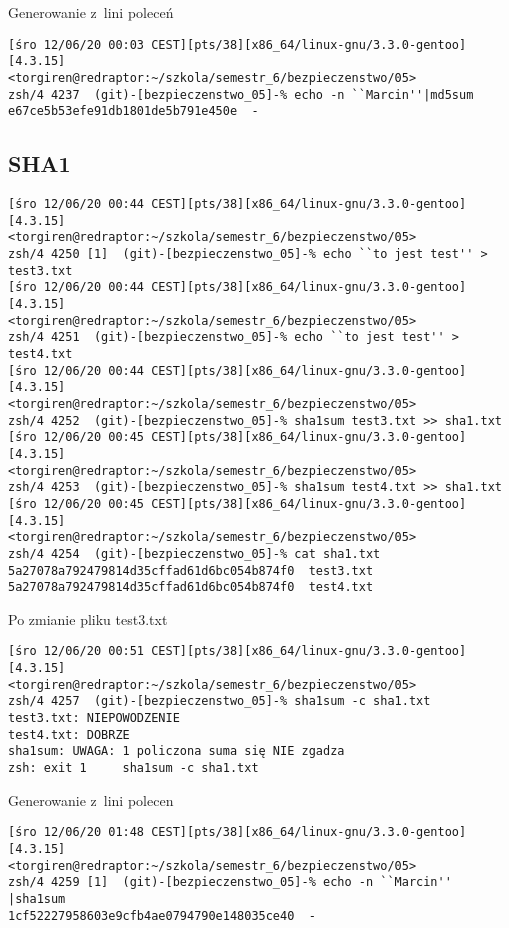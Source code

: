 \documentclass[a4paper,12pt]{article}
\begin{document}
\normalsize
Generowanie z~lini poleceń
\small
\begin{verbatim}
[śro 12/06/20 00:03 CEST][pts/38][x86_64/linux-gnu/3.3.0-gentoo][4.3.15]
<torgiren@redraptor:~/szkola/semestr_6/bezpieczenstwo/05>
zsh/4 4237  (git)-[bezpieczenstwo_05]-% echo -n ``Marcin''|md5sum
e67ce5b53efe91db1801de5b791e450e  -
\end{verbatim}
\normalsize
\subsection{SHA1}
\small
\begin{verbatim}
[śro 12/06/20 00:44 CEST][pts/38][x86_64/linux-gnu/3.3.0-gentoo][4.3.15]
<torgiren@redraptor:~/szkola/semestr_6/bezpieczenstwo/05>
zsh/4 4250 [1]  (git)-[bezpieczenstwo_05]-% echo ``to jest test'' > test3.txt
[śro 12/06/20 00:44 CEST][pts/38][x86_64/linux-gnu/3.3.0-gentoo][4.3.15]
<torgiren@redraptor:~/szkola/semestr_6/bezpieczenstwo/05>
zsh/4 4251  (git)-[bezpieczenstwo_05]-% echo ``to jest test'' > test4.txt
[śro 12/06/20 00:44 CEST][pts/38][x86_64/linux-gnu/3.3.0-gentoo][4.3.15]
<torgiren@redraptor:~/szkola/semestr_6/bezpieczenstwo/05>
zsh/4 4252  (git)-[bezpieczenstwo_05]-% sha1sum test3.txt >> sha1.txt
[śro 12/06/20 00:45 CEST][pts/38][x86_64/linux-gnu/3.3.0-gentoo][4.3.15]
<torgiren@redraptor:~/szkola/semestr_6/bezpieczenstwo/05>
zsh/4 4253  (git)-[bezpieczenstwo_05]-% sha1sum test4.txt >> sha1.txt
[śro 12/06/20 00:45 CEST][pts/38][x86_64/linux-gnu/3.3.0-gentoo][4.3.15]
<torgiren@redraptor:~/szkola/semestr_6/bezpieczenstwo/05>
zsh/4 4254  (git)-[bezpieczenstwo_05]-% cat sha1.txt 
5a27078a792479814d35cffad61d6bc054b874f0  test3.txt
5a27078a792479814d35cffad61d6bc054b874f0  test4.txt
\end{verbatim}
\normalsize
Po zmianie pliku test3.txt
\small
\begin{verbatim}
[śro 12/06/20 00:51 CEST][pts/38][x86_64/linux-gnu/3.3.0-gentoo][4.3.15]
<torgiren@redraptor:~/szkola/semestr_6/bezpieczenstwo/05>
zsh/4 4257  (git)-[bezpieczenstwo_05]-% sha1sum -c sha1.txt   
test3.txt: NIEPOWODZENIE
test4.txt: DOBRZE
sha1sum: UWAGA: 1 policzona suma się NIE zgadza
zsh: exit 1     sha1sum -c sha1.txt
\end{verbatim}
\normalsize
Generowanie z~lini polecen
\small
\begin{verbatim}
[śro 12/06/20 01:48 CEST][pts/38][x86_64/linux-gnu/3.3.0-gentoo][4.3.15]
<torgiren@redraptor:~/szkola/semestr_6/bezpieczenstwo/05>
zsh/4 4259 [1]  (git)-[bezpieczenstwo_05]-% echo -n ``Marcin'' |sha1sum 
1cf52227958603e9cfb4ae0794790e148035ce40  -
\end{verbatim}
\end{document}

